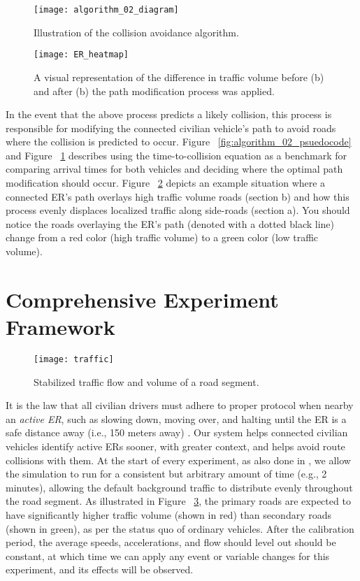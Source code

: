		\begin{figure}
			\texttt{[image: algorithm\_02\_diagram]}
			\caption{Illustration of the collision avoidance algorithm.}
			\label{fig:algorithm_02_diagram}
		\end{figure}
		
		\begin{figure}
			\texttt{[image: ER\_heatmap]}
			\caption{A visual representation of the difference in traffic volume before (b) and after (b) the path modification process was applied.}
			\label{fig:ER_heatmap}
		\end{figure}
		
		In the event that the above process predicts a likely collision, this process is responsible for modifying the connected civilian vehicle's path to avoid roads where the collision is predicted to occur. Figure ~\ref{fig:algorithm_02_psuedocode} and Figure ~\ref{fig:algorithm_02_diagram} describes using the time-to-collision equation as a benchmark for comparing arrival times for both vehicles and deciding where the optimal path modification should occur. 
		Figure ~\ref{fig:ER_heatmap} depicts an example situation where a connected ER's path overlays high traffic volume roads (section b) and how this process evenly displaces localized traffic along side-roads (section a). You should notice the roads overlaying the ER's path (denoted with a dotted black line) change from a red color (high traffic volume) to a green color (low traffic volume). 


\section{Comprehensive Experiment Framework}
	\begin{figure}
		\texttt{[image: traffic]}
		\caption{Stabilized traffic flow and volume of a road segment.}
		\label{fig:traffic}
	\end{figure}

	It is the law that all civilian drivers must adhere to proper protocol when nearby an \textit{active \acrshort{ER}}, such as slowing down, moving over, and halting until the \acrshort{ER} is a safe distance away (i.e., 150 meters away) \cite{MoveOver_2021, MTO_2020}. Our system helps connected civilian vehicles identify active \acrshort{ER}s sooner, with greater context, and helps avoid route collisions with them.  At the start of every experiment, as also done in \cite{Rizvi2007, Bahaaldin2017}, we allow the simulation to run for a consistent but arbitrary amount of time (e.g., 2 minutes), allowing the default background traffic to distribute evenly throughout the road segment. As illustrated in Figure ~\ref{fig:traffic}, the primary roads are expected to have significantly higher traffic volume (shown in red) than secondary roads (shown in green), as per the status quo of ordinary vehicles. After the calibration period, the average speeds, accelerations, and flow should level out should be constant, at which time we can apply any event or variable changes for this experiment, and its effects will be observed. 
	
